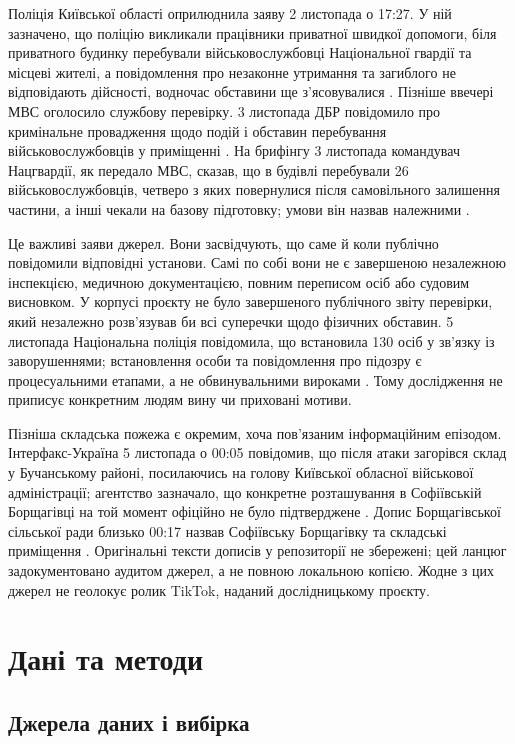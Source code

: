 Поліція Київської області оприлюднила заяву 2 листопада о 17:27. У ній зазначено, що поліцію викликали працівники приватної швидкої допомоги, біля приватного будинку перебували військовослужбовці Національної гвардії та місцеві жителі, а повідомлення про незаконне утримання та загиблого не відповідають дійсності, водночас обставини ще з'ясовувалися \citep{npu2026statement}. Пізніше ввечері МВС оголосило службову перевірку. 3 листопада ДБР повідомило про кримінальне провадження щодо подій і обставин перебування військовослужбовців у приміщенні \citep{dbr2026proceeding}. На брифінгу 3 листопада командувач Нацгвардії, як передало МВС, сказав, що в будівлі перебували 26 військовослужбовців, четверо з яких повернулися після самовільного залишення частини, а інші чекали на базову підготовку; умови він назвав належними \citep{mvs2026briefing}.

Це важливі заяви джерел. Вони засвідчують, що саме й коли публічно повідомили відповідні установи. Самі по собі вони не є завершеною незалежною інспекцією, медичною документацією, повним переписом осіб або судовим висновком. У корпусі проєкту не було завершеного публічного звіту перевірки, який незалежно розв'язував би всі суперечки щодо фізичних обставин. 5 листопада Національна поліція повідомила, що встановила 130 осіб у зв'язку із заворушеннями; встановлення особи та повідомлення про підозру є процесуальними етапами, а не обвинувальними вироками \citep{npu2026identified}. Тому дослідження не приписує конкретним людям вину чи приховані мотиви.

Пізніша складська пожежа є окремим, хоча пов'язаним інформаційним епізодом. Інтерфакс-Україна 5 листопада о 00:05 повідомив, що після атаки загорівся склад у Бучанському районі, посилаючись на голову Київської обласної військової адміністрації; агентство зазначало, що конкретне розташування в Софіївській Борщагівці на той момент офіційно не було підтверджене \citep{interfax2026fire}. Допис Борщагівської сільської ради близько 00:17 назвав Софіївську Борщагівку та складські приміщення \citep{village2026fire}. Оригінальні тексти дописів у репозиторії не збережені; цей ланцюг задокументовано аудитом джерел, а не повною локальною копією. Жодне з цих джерел не геолокує ролик TikTok, наданий дослідницькому проєкту.

\section{Дані та методи}

\subsection{Джерела даних і вибірка}

